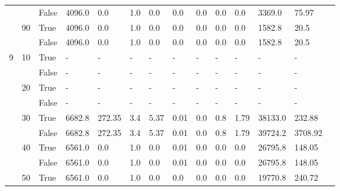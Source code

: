 \documentclass{article}
\begin{document}
\begin{landscape}
\begin{small}
\begin{longtable}[c]{@{}lll|ll|ll|ll|ll|lll@{}}
   &    & False & 4096.0          & 0.0            & 1.0           & 0.0           & 0.0           & 0.0           & 0.0           & 0.0           & 3369.0        & 75.97       &  \\
   & 90 & True  & 4096.0          & 0.0            & 1.0           & 0.0           & 0.0           & 0.0           & 0.0           & 0.0           & 1582.8        & 20.5        &  \\
   &    & False & 4096.0          & 0.0            & 1.0           & 0.0           & 0.0           & 0.0           & 0.0           & 0.0           & 1582.8        & 20.5        &  \\
  \midrule
9  & 10 & True  & -               & -              & -             & -             & -             & -             & -             & -             & -             & -           &  \\
   &    & False & -               & -              & -             & -             & -             & -             & -             & -             & -             & -           &  \\
   & 20 & True  & -               & -              & -             & -             & -             & -             & -             & -             & -             & -           &  \\
   &    & False & -               & -              & -             & -             & -             & -             & -             & -             & -             & -           &  \\
   & 30 & True  & 6682.8          & 272.35         & 3.4           & 5.37          & 0.01          & 0.0           & 0.8           & 1.79          & 38133.0       & 232.88      &  \\
   &    & False & 6682.8          & 272.35         & 3.4           & 5.37          & 0.01          & 0.0           & 0.8           & 1.79          & 39724.2       & 3708.92     &  \\
   & 40 & True  & 6561.0          & 0.0            & 1.0           & 0.0           & 0.01          & 0.0           & 0.0           & 0.0           & 26795.8       & 148.05      &  \\
   &    & False & 6561.0          & 0.0            & 1.0           & 0.0           & 0.01          & 0.0           & 0.0           & 0.0           & 26795.8       & 148.05      &  \\
   & 50 & True  & 6561.0          & 0.0            & 1.0           & 0.0           & 0.0           & 0.0           & 0.0           & 0.0           & 19770.8       & 240.72      &  \\

\end{longtable}
\end{small}
\end{landscape}
\end{document}
